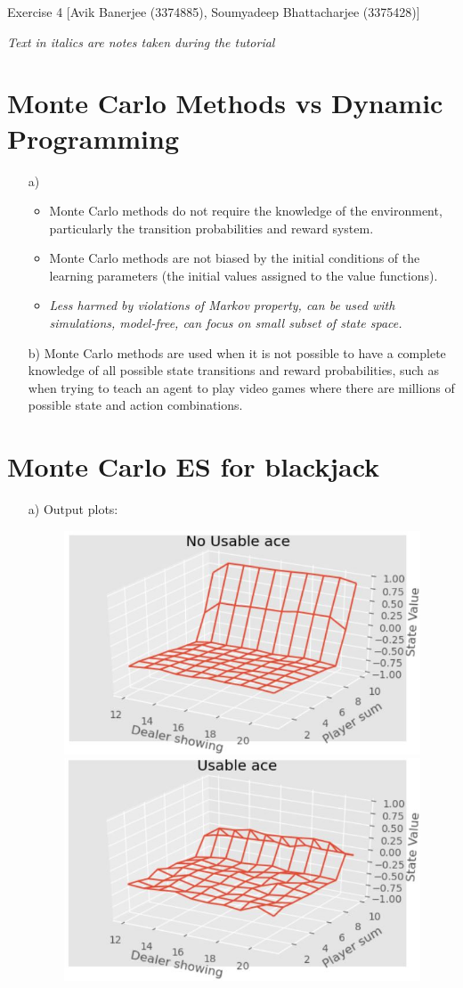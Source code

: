 \documentclass{article}
\begin{document}
\begin{center}
	{\LARGE Exercise 4}\linebreak
	{\large [Avik Banerjee (3374885), Soumyadeep Bhattacharjee (3375428)]}
\end{center}
\textit{Text in italics are notes taken during the tutorial}
\section{Monte Carlo Methods vs Dynamic Programming }
\begin{enumerate}
	\item[a)]
	\begin{itemize}
		\item Monte Carlo methods do not require the knowledge of the environment, particularly the transition probabilities and reward system.
		\item Monte Carlo methods are not biased by the initial conditions of the learning parameters (the initial values assigned to the value functions).
		\item \textit{Less harmed by violations of Markov property, can be used with simulations, model-free, can focus on small subset of state space.}
	\end{itemize}
	\item[b)] Monte Carlo methods are used when it is not possible to have a complete knowledge of all possible state transitions and reward probabilities, such as when trying to teach an agent to play video games where there are millions of possible state and action combinations.
\end{enumerate}
\section{Monte Carlo ES for blackjack}
\begin{enumerate}
	\item[a)] Output plots: \begin{figure}[H]
		\includegraphics[width=0.5\linewidth]{blackjack1.jpg}
		\includegraphics[width=0.5\linewidth]{blackjack2.jpg}
	\end{figure}
\end{enumerate}
\end{document}
